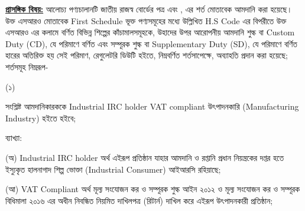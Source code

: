 \documentclass[12pt]{article}
\begin{document}
\begin{minipage}[t]{0.95\linewidth}
\underline{\textbf{প্রাসঙ্গিক বিষয়:}} আলোচ্য পণ্যচালানটি
জাতীয় রাজস্ব বোর্ডের পত্র এবং
{\srooof}, {\srooofd}
এর শর্ত মোতাবেক আমদানি করা হয়েছে।
উক্ত এসআরও মোতাবেক First Schedule
ভূক্ত পণ্যসমূহের মধ্যে উল্লিখিত H.S Code
এর বিপরীতে উক্ত এসআরও এর কলামে বর্ণিত
বিভিন্ন শিল্পের কাঁচামালসমূহকে, উহাদের উপর
আরোপনীয় আমদানি শুল্ক বা Custom Duty (CD),
যে পরিমাণে বর্ণিত এবং সম্পূরক শুল্ক বা
Supplementary Duty (SD),
যে পরিমাণে বর্ণিত হারের অতিরিক্ত হয় সেই পরিমাণ,
রেগুলেটরি ডিউটি হইতে, নিম্নবর্ণিত শর্তসাপেক্ষে,
অব্যাহতি প্রদান করা হয়েছে; শর্তসমূহ নিম্নরূপ-
\\
\end{minipage}
\begin{minipage}[t]{0.05\linewidth}
\hspace{1em}
\end{minipage}
\begin{minipage}[t]{0.05\linewidth}
(১)
\end{minipage}
\begin{minipage}[t]{0.9\linewidth}
 সংশ্লিষ্ট আমদানিকারককে
 Industrial IRC holder VAT compliant
 উৎপাদনকারি (Manufacturing Industry) হইতে
 হইবে;
 \\
\end{minipage}
\begin{minipage}[t]{0.1\linewidth}
\hspace{1em}
\end{minipage}
\begin{minipage}[t]{0.9\linewidth}
ব্যাখ্যা:
 \\
\end{minipage}
\begin{minipage}[t]{0.1\linewidth}
\hspace{1em}
\end{minipage}
\begin{minipage}[t]{0.9\linewidth}
(অ) Industrial IRC holder অর্থ
এইরূপ প্রতিষ্ঠান যাহার আমদানি ও রপ্তানি
প্রধান নিয়ন্ত্রকের দপ্তর হতে ইস্যুকৃত হালনাগাদ
শিল্প ভোক্তা (Industrial Consumer) আইআরসি
রহিয়াছে;
\\
\end{minipage}
\begin{minipage}[t]{0.1\linewidth}
\hspace{1em}
\end{minipage}
\begin{minipage}[t]{0.9\linewidth}
(আ) VAT Compliant অর্থ মূল্য
সংযোজন কর ও সম্পূরক শুল্ক আইন ২০১২
ও মূল্য সংযোজন কর ও সম্পূরক বিধিমালা ২০১৬
এর অধীন নিবন্ধিত নিয়মিত দাখিলপত্র (রিটার্ন) দাখিল
করে এইরূপ উৎপাদনকারী প্রতিষ্ঠান;
\\
\end{minipage}
\end{document}

